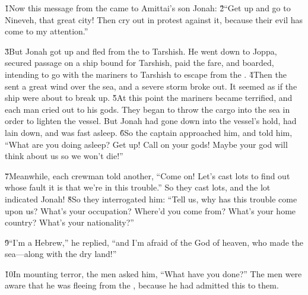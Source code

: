 


\v{1}Now this message from the  came to Amittai's son Jonah: \v{2}``Get up and go to Nineveh, that great city! Then cry out in protest against it, because their evil has come to my attention.''

\v{3}But Jonah got up and fled from the  to Tarshish. He went down to Joppa, secured passage on a ship bound for Tarshish, paid the fare, and boarded, intending to go with the mariners to Tarshish to escape from the . \v{4}Then the  sent a great wind over the sea, and a severe storm broke out. It seemed as if the ship were about to break up. \v{5}At this point the mariners became terrified, and each man cried out to his gods. They began to throw the cargo into the sea in order to lighten the vessel. But Jonah had gone down into the vessel's hold, had lain down, and was fast asleep. \v{6}So the captain approached him, and told him, ``What are you doing asleep? Get up! Call on your gods! Maybe your god will think about us so we won't die!''

\v{7}Meanwhile, each crewman told another, ``Come on! Let's cast lots to find out whose fault it is that we're in this trouble.'' So they cast lots, and the lot indicated Jonah! \v{8}So they interrogated him: ``Tell us, why has this trouble come upon us? What's your occupation? Where'd you come from? What's your home country? What's your nationality?''

\v{9}``I'm a Hebrew,'' he replied, ``and I'm afraid of the  God of heaven, who made the sea---along with the dry land!''

\v{10}In mounting terror, the men asked him, ``What have you done?'' The men were aware that he was fleeing from the , because he had admitted this to them.

